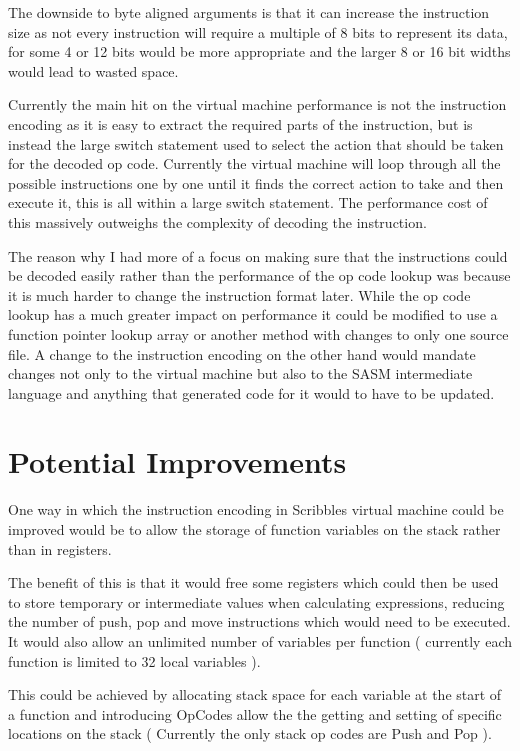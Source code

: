 \documentclass[]{final_report}
\begin{document}
The downside to byte aligned arguments is that it can increase the instruction size as not every instruction will require a multiple of 8 bits to represent its data, for some 4 or 12 bits would be more appropriate and the larger 8 or 16 bit widths would lead to wasted space.

Currently the main hit on the virtual machine performance is not the instruction encoding as it is easy to extract the required parts of the instruction, but is instead the large switch statement used to select the action that should be taken for the decoded op code. Currently the virtual machine will loop through all the possible instructions one by one until it finds the correct action to take and then execute it, this is all within a large switch statement. The performance cost of this massively outweighs the complexity of decoding the instruction.

The reason why I had more of a focus on making sure that the instructions could be decoded easily rather than the performance of the op code lookup was because it is much harder to change the instruction format later. While the op code lookup has a much greater impact on performance it could be modified to use a function pointer lookup array or another method with changes to only one source file. A change to the instruction encoding on the other hand would mandate changes not only to the virtual machine but also to the SASM intermediate language and anything that generated code for it would to have to be updated.

\section{Potential Improvements}

One way in which the instruction encoding in Scribbles virtual machine could be improved would be to allow the storage of function variables on the stack rather than in registers.

The benefit of this is that it would free some registers which could then be used to store temporary or intermediate values when calculating expressions, reducing the number of push, pop and move instructions which would need to be executed. It would also allow an unlimited number of variables per function ( currently each function is limited to 32 local variables ).

This could be achieved by allocating stack space for each variable at the start of a function and introducing OpCodes allow the the getting and setting of specific locations on the stack ( Currently the only stack op codes are Push and Pop ).
\end{document}
